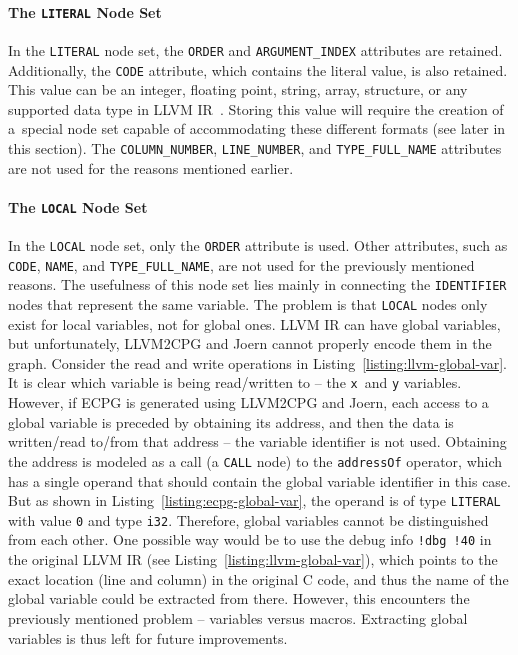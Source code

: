 \paragraph{The \texttt{LITERAL} Node Set}
In the \texttt{LITERAL} node set, the \texttt{ORDER} and \texttt{ARGUMENT\_INDEX} attributes are retained. Additionally, the \texttt{CODE} attribute, which contains the literal value, is also retained. This value can be an integer, floating point, string, array, structure, or any supported data type in LLVM IR~\cite{LLVM-IR}. Storing this value will require the creation of a~special node set capable of accommodating these different formats (see later in this section). The \texttt{COLUMN\_NUMBER}, \texttt{LINE\_NUMBER}, and \texttt{TYPE\_FULL\_NAME} attributes are not used for the reasons mentioned earlier.

\paragraph{The \texttt{LOCAL} Node Set}
In the \texttt{LOCAL} node set, only the \texttt{ORDER} attribute is used. Other attributes, such as \texttt{CODE}, \texttt{NAME}, and \texttt{TYPE\_FULL\_NAME}, are not used for the previously mentioned reasons. The usefulness of this node set lies mainly in connecting the \texttt{IDENTIFIER} nodes that represent the same variable. The problem is that \texttt{LOCAL} nodes only exist for local variables, not for global ones. LLVM IR can have global variables, but unfortunately, LLVM2CPG and Joern cannot properly encode them in the graph. Consider the read and write operations in Listing~\ref{listing:llvm-global-var}. It is clear which variable is being read/written to -- the \texttt{x}~and \texttt{y} variables. However, if ECPG is generated using LLVM2CPG and Joern, each access to a global variable is preceded by obtaining its address, and then the data is written/read to/from that address -- the variable identifier is not used. Obtaining the address is modeled as a call (a \texttt{CALL} node) to the \texttt{addressOf} operator, which has a single operand that should contain the global variable identifier in this case. But as shown in Listing~\ref{listing:ecpg-global-var}, the operand is of type \texttt{LITERAL} with value \texttt{0} and type \texttt{i32}. Therefore, global variables cannot be distinguished from each other. One possible way would be to use the debug info \texttt{!dbg !40} in the original LLVM IR (see Listing~\ref{listing:llvm-global-var}), which points to the exact location (line and column) in the original C code, and thus the name of the global variable could be extracted from there. However, this encounters the previously mentioned problem -- variables versus macros. Extracting global variables is thus left for future improvements.


